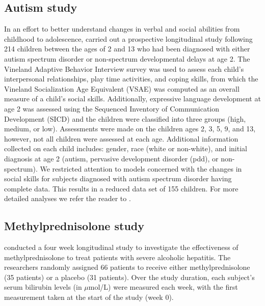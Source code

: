 \documentclass[12pt]{article} %
\newcommand{\alnote}[1]{\todo[inline,color=green!40]{#1}} %
\begin{document}
\subsection{Autism study}\label{data:autism}
In an effort to better understand changes in verbal and social abilities from childhood to adolescence, \cite{Anderson:2007cl, Anderson:2009in} carried out a prospective longitudinal study following 214 children between the ages of 2 and 13 who had been diagnosed with either autism spectrum disorder or non-spectrum developmental delays at age 2. The Vineland Adaptive Behavior Interview survey was used to assess each child's interpersonal relationships, play time activities, and coping skills, 
from which the Vineland Socialization Age Equivalent (VSAE) was computed as an overall measure of a child's social skills. Additionally, expressive language development at age 2 was assessed using the Sequenced Inventory of Communication Development (SICD) and the children were classified into three groups (high, medium, or low). Assessments were made on the children ages 2, 3, 5, 9, and 13, however, not all children were assessed at each age. Additional information collected on each child includes: gender, race (white or non-white), and initial diagnosis at age 2 (autism, pervasive development disorder (pdd), or non-spectrum). We restricted attention to models concerned with the changes in social skills for subjects diagnosed with autism spectrum disorder having complete data. This results in a reduced data set of 155 children. For more detailed analyses we refer the reader to \cite{Anderson:2007cl, Anderson:2009in}.

\subsection{Methylprednisolone study}\label{data:ahd}

\cite{Carithers:1989} conducted a four week longitudinal study to investigate the effectiveness of methylprednisolone to treat patients with severe alcoholic hepatitis. The researchers randomly assigned 66 patients to receive either methylprednisolone (35 patients) or a placebo (31 patients). Over the study duration, each subject's serum bilirubin levels (in $\mu$mol/L) were measured each week, with the first measurement taken at the start of the study (week 0).
\end{document}
